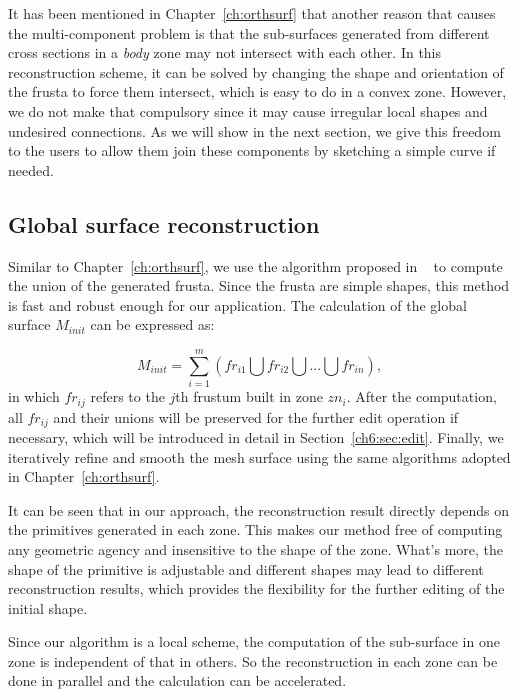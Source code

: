 It has been mentioned  in Chapter~\ref{ch:orthsurf} that another
reason that causes the multi-component problem is that the
sub-surfaces generated from different cross sections in a
\textit{body} zone may not intersect with each other. In this
reconstruction scheme, it can be solved by changing the shape and
orientation of the frusta to force them intersect, which is easy to
do in a convex zone. However, we do not make that compulsory since
it may cause irregular local shapes and undesired connections. As we
will show in the next section, we give this freedom to the users to
allow them join these components by sketching a simple curve if
needed.



\subsection{Global surface reconstruction}
\label{ch6:sec:reconst:global}

Similar to Chapter~\ref{ch:orthsurf},  we use the algorithm proposed
in ~\cite{LTH86} to compute the union of the generated frusta. Since
the frusta are simple shapes, this method is fast and robust enough
for our application. The calculation of the global surface
$M_{init}$ can be expressed as:

\begin{equation}
\label{eq:surfreconst}
    M_{init}=\sum\limits_{i=1}^m {(fr_{i1} \bigcup fr_{i2} \bigcup {...} \bigcup fr_{in})},
\end{equation}
in which $fr_{ij}$ refers to the  $j$th frustum built in zone
$zn_i$. After the computation, all $fr_{ij}$ and their unions will
be preserved for the further edit operation if necessary, which will
be introduced in detail in Section~\ref{ch6:sec:edit}. Finally, we
iteratively refine and smooth the mesh surface using the same
algorithms adopted in Chapter~\ref{ch:orthsurf}.

It can be seen that in our  approach, the reconstruction result
directly depends on the primitives generated in each zone. This
makes our method free of computing any geometric agency and
insensitive to the shape of the zone. What's more, the shape of the
primitive is adjustable and different shapes may lead to different
reconstruction results, which provides the flexibility for the
further editing of the initial shape.

Since our algorithm is a local scheme, the  computation of the
sub-surface in one zone is independent of that in others. So the
reconstruction in each zone can be done in parallel and the
calculation can be accelerated.



